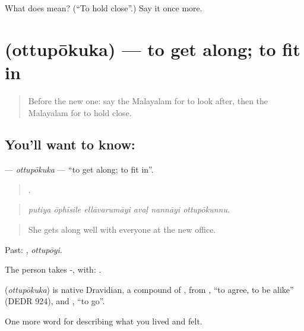 \begin{tcolorbox}[breakable,colback=teal!4,colframe=teal!35!black,title={Before you move on}]
What does  mean? (\textquotedblleft{}To hold close\textquotedblright{}.) Say it once more.
\end{tcolorbox}
\section[\texorpdfstring{\ml{ഒത്തുപോകുക} (ottupōkuka)}{ഒത്തുപോകുക (ottupōkuka)}]{ (ottupōkuka) — to get along; to fit in}

\label{lesson:ML-C559-ottupokuka}



\begin{quote}
Before the new one: say the Malayalam for to look after, then the Malayalam for to hold close.
\end{quote}

\subsection*{You'll want to know: }
\textbf{} — \emph{ottupōkuka} — \textquotedblleft{}to get along; to fit in\textquotedblright{}.

\begin{quote}
     .
\end{quote}

\begin{quote}
\emph{putiya ōphīsile ellāvarumāyi avaḷ nannāyi ottupōkunnu.}
\end{quote}

\begin{quote}
She gets along well with everyone at the new office.
\end{quote}

Past: , \emph{ottupōyi}.

The person takes -, with:  .

\begin{cousinweb}
\textbf{} (\emph{ottupōkuka}) is native Dravidian, a compound of , from , \textquotedblleft{}to agree, to be alike\textquotedblright{} (DEDR 924), and , \textquotedblleft{}to go\textquotedblright{}.
\end{cousinweb}

\begin{grammarlens}[title={What you've built}]
One more word for describing what you lived and felt.
\end{grammarlens}

